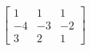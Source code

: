 %
\begin{align*}
\begin{bmatrix}
1 & 1 & 1 \\
-4 & -3 & -2 \\
3 & 2 & 1
\end{bmatrix}
\end{align*}
%
